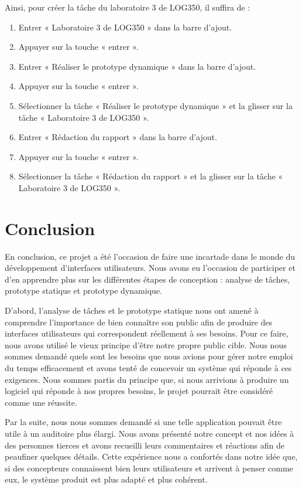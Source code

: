 \documentclass[letterpaper, oneside, 12pt, these, creativecommons]{thETS}
\begin{document}
Ainsi, pour créer la tâche du laboratoire 3 de LOG350, il suffira de :

\begin{enumerate}
    \item Entrer « Laboratoire 3 de LOG350 » dans la barre d'ajout.
    \item Appuyer sur la touche « entrer ».
    \item Entrer « Réaliser le prototype dynamique » dans la barre d'ajout.
    \item Appuyer sur la touche « entrer ».
    \item Sélectionner la tâche « Réaliser le prototype dynamique » et la glisser sur la tâche « Laboratoire 3 de LOG350 ».
    \item Entrer « Rédaction du rapport » dans la barre d'ajout.
    \item Appuyer sur la touche « entrer ».
    \item Sélectionner la tâche « Rédaction du rapport » et la glisser sur la tâche « Laboratoire 3 de LOG350 ».
\end{enumerate}

\chapter{Conclusion}

En conclusion, ce projet a été l'occasion de faire une incartade dans le monde du développement d'interfaces utilisateurs. Nous avons eu l'occasion de participer et d'en apprendre plus sur les différentes étapes de conception : analyse de tâches, prototype statique et prototype dynamique.

D'abord, l'analyse de tâches et le prototype statique nous ont amené à comprendre l'importance de bien connaître son public afin de produire des interfaces utilisateurs qui correspondent réellement à ses besoins. Pour ce faire, nous avons utilisé le vieux principe d'être notre propre public cible. Nous nous sommes demandé quels sont les besoins que nous avions pour gérer notre emploi du temps efficacement et avons tenté de concevoir un système qui réponde à ces exigences. Nous sommes partis du principe que, si nous arrivions à produire un logiciel qui réponde à nos propres besoins, le projet pourrait être considéré comme une réussite.

Par la suite, nous nous sommes demandé si une telle application pouvait être utile à un auditoire plus élargi. Nous avons présenté notre concept et nos idées à des personnes tierces et avons recueilli leurs commentaires et réactions afin de peaufiner quelques détails. Cette expérience nous a confortés dans notre idée que, si des concepteurs connaissent bien leurs utilisateurs et arrivent à penser comme eux, le système produit est plus adapté et plus cohérent.
\end{document}
